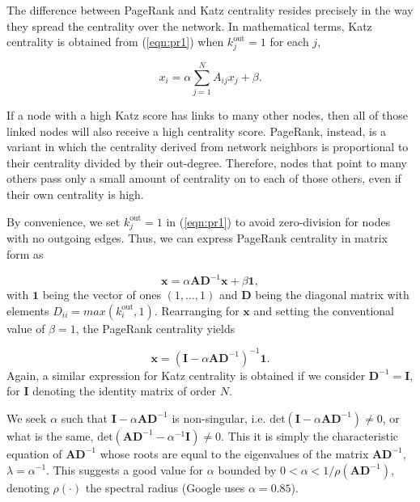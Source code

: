 The difference between PageRank and Katz centrality resides precisely in the way they spread the centrality over the network. In mathematical terms, Katz centrality is obtained from (\ref{eqn:pr1}) when $k_j^{\text{out}}=1$ for each $j$,

\begin{equation}
\label{eqn:katz1}
    x_i= \alpha\sum_{j=1}^{N}A_{ij}x_j + \beta.
\end{equation}

If a node with a high Katz score has links to many other nodes, then all of those linked nodes will also receive a high centrality score. PageRank, instead, is a variant in which the centrality derived from network neighbors is proportional to their centrality divided by their out-degree. Therefore, nodes that point to many others pass only a small amount of centrality on to each of those others, even if their own centrality is high.

By convenience, we set $k_j^{\text{out}}=1$ in (\ref{eqn:pr1}) to avoid zero-division for nodes with no outgoing edges. Thus, we can express PageRank centrality in matrix form as

\begin{equation}
\label{eqn:pr2}
    \mathbf{x} = \alpha\mathbf{AD}^{-1}\mathbf{x} + \beta \mathbf{1},
\end{equation}
with $\mathbf{1}$ being the vector of ones $(1,\dots,1)$ and $\mathbf{D}$ being the diagonal matrix with elements $D_{ii} = max(k_i^{\text{out}},1)$. Rearranging for $\mathbf{x}$ and setting the conventional value of $\beta=1$, the PageRank centrality yields

\begin{equation}
\label{eqn:pr3}
    \mathbf{x} = (\mathbf{I} - \alpha\mathbf{AD}^{-1})^{-1} \mathbf{1}.
\end{equation}
Again, a similar expression for Katz centrality is obtained if we consider $\mathbf{D}^{-1}= \mathbf{I}$, for $\mathbf{I}$ denoting the identity matrix of order $N$.

We seek $\alpha$ such that $\mathbf{I}-\alpha\mathbf{AD}^{-1}$ is non-singular, i.e. $\text{det}(\mathbf{I}-\alpha\mathbf{AD}^{-1})\neq 0$, or what is the same, $\text{det}(\mathbf{AD}^{-1}-\alpha^{-1}\mathbf{I})\neq 0$. This it is simply the characteristic equation of $\mathbf{AD}^{-1}$ whose roots are equal to the eigenvalues of the matrix $\mathbf{AD}^{-1}$, $\lambda=\alpha^{-1}$. This suggests a good value for $\alpha$ bounded by $0 < \alpha < 1/\rho(\mathbf{AD}^{-1})$, denoting $\rho(\cdot)$ the spectral radius (Google uses $\alpha = 0.85$). 

